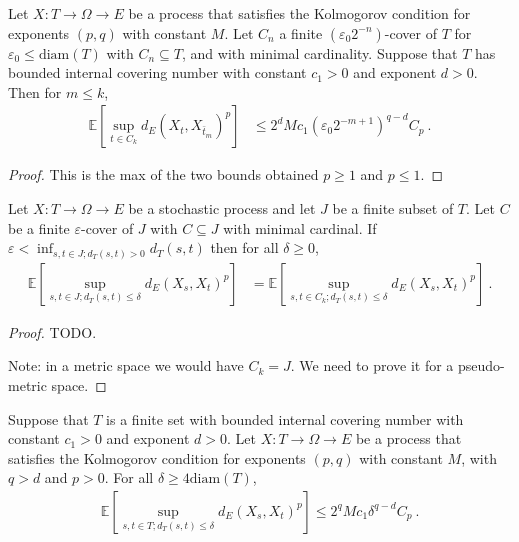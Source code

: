 \begin{lemma}\label{lem:second_term_bound}
  \leanok
Let $X : T \to \Omega \to E$ be a process that satisfies the Kolmogorov condition for exponents $(p,q)$ with constant $M$.
Let $C_n$ a finite $(\varepsilon_0 2^{-n})$-cover of $T$ for $\varepsilon_0 \le \mathrm{diam}(T)$ with $C_n \subseteq T$, and with minimal cardinality.
Suppose that $T$ has bounded internal covering number with constant $c_1>0$ and exponent $d > 0$.
Then for $m \le k$,
\begin{align*}
  \mathbb{E} \left[\sup_{t \in C_k} d_E(X_t, X_{\bar{t}_m})^p \right]
  &\le 2^d M c_1 (\varepsilon_0 2^{-m + 1})^{q - d} C_p
  \: .
\end{align*}
\end{lemma}

\begin{proof}
This is the max of the two bounds obtained $p \ge 1$ and $p \le 1$.
\end{proof}


\begin{lemma}\label{lem:lintegral_sup_eq_lintegral_sup_cover}
  \leanok
Let $X : T \to \Omega \to E$ be a stochastic process and let $J$ be a finite subset of $T$.
Let $C$ be a finite $\varepsilon$-cover of $J$ with $C \subseteq J$ with minimal cardinal.
If $\varepsilon < \inf_{s, t \in J; d_T(s,t)>0}d_T(s, t)$ then for all $\delta \ge 0$,
\begin{align*}
  \mathbb{E}\left[ \sup_{s, t \in J; d_T(s, t) \le \delta} d_E(X_s, X_t)^p \right]
  &= \mathbb{E}\left[ \sup_{s, t \in C_k; d_T(s, t) \le \delta} d_E(X_s, X_t)^p \right]
  \: .
\end{align*}
\end{lemma}

\begin{proof}
TODO.

Note: in a metric space we would have $C_k = J$. We need to prove it for a pseudo-metric space.
\end{proof}


\begin{theorem}\label{thm:finite_set_bound_of_dist_le_of_diam_le}
  \leanok
Suppose that $T$ is a finite set with bounded internal covering number with constant $c_1>0$ and exponent $d > 0$.
Let $X : T \to \Omega \to E$ be a process that satisfies the Kolmogorov condition for exponents $(p,q)$ with constant $M$, with $q > d$ and $p > 0$.
For all $\delta \ge 4\mathrm{diam}(T)$,
\begin{align*}
  \mathbb{E}\left[ \sup_{s, t \in T; d_T(s, t) \le \delta} d_E(X_s, X_t)^p \right]
  \le 2^q M c_1 \delta^{q - d} C_p
  \: .
\end{align*}
\end{theorem}

